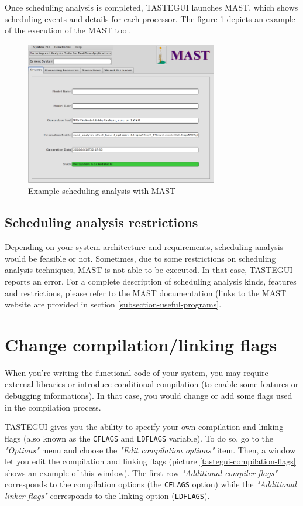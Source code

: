 \documentclass[11pt]{book}
\begin{document}
   Once scheduling analysis is completed, TASTEGUI launches MAST, which shows
   scheduling events and details for each processor. The figure
   \ref{tastegui-mast} depicts an example of the execution of the MAST tool.

\begin{figure}[!h]
\centering
\includegraphics[width=0.75\textwidth]{imgs/tastegui-mast}
\caption{Example scheduling analysis with MAST}
\label{tastegui-mast}
\end{figure}


      \subsection{Scheduling analysis restrictions}
      Depending on your system architecture and requirements, scheduling
      analysis would be feasible or not. Sometimes, due to some restrictions on
      scheduling analysis techniques, MAST is not able to be executed. In that
      case, TASTEGUI reports an error. For a complete description of scheduling
      analysis kinds, features and restrictions, please refer to the MAST
      documentation (links to the MAST website are provided in section
      \ref{subsection-useful-programs}.


   \section{Change compilation/linking flags}
   When you're writing the functional code of your system, you may require
   external libraries or introduce conditional compilation (to enable some
   features or debugging informations). In that case, you would change or add
   some flags used in the compilation process.

   TASTEGUI gives you the ability to specify your own compilation and linking
   flags (also known as the \texttt{CFLAGS} and \texttt{LDFLAGS} variable). To
   do so, go to the \textit{"Options"} menu and choose the \textit{"Edit
   compilation options"} item. Then, a window let you edit the compilation and
   linking flags (picture \ref{tastegui-compilation-flags} shows an example of
   this window). The first row \textit{"Additional compiler flags"} corresponds
   to the compilation options (the \texttt{CFLAGS} option) while the
   \textit{"Additional linker flags"} corresponds to the linking option
   (\texttt{LDFLAGS}).
\end{document}
